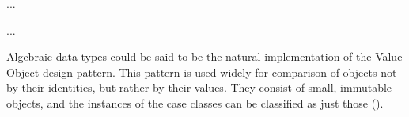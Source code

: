 {
  \small
  
}
...

{
  \small
  
}
...

Algebraic data types could be said to be the natural implementation of the
Value Object design pattern. This pattern is used widely for comparison of
objects not by their identities, but rather by their values. They consist of
small, immutable objects, and the instances of the case classes can be
classified as just those (\cite[][Ch.~8,~Location~3068]{nikolov2016scala}).
